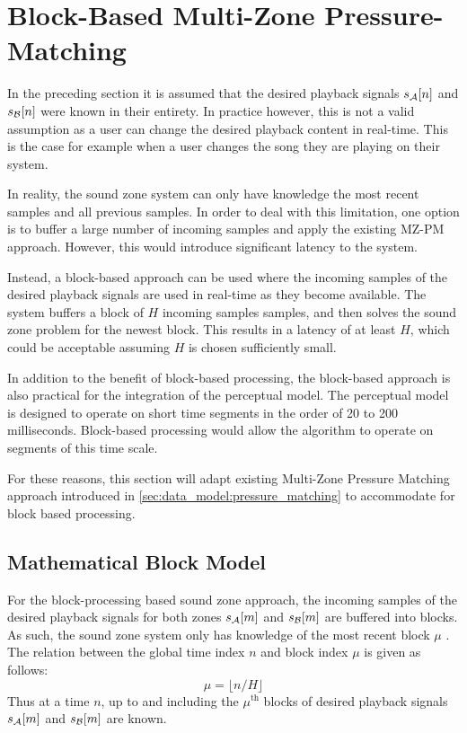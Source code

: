\section{Block-Based Multi-Zone Pressure-Matching}
In the preceding section it is assumed that the desired playback signals $s_{\mathcal{A}}[n]$ and $s_{\mathcal{B}}[n]$ were known in their entirety.
In practice however, this is not a valid assumption as a user can change the desired playback content in real-time.
This is the case for example when a user changes the song they are playing on their system.

In reality, the sound zone system can only have knowledge the most recent samples and all previous samples.
In order to deal with this limitation, one option is to buffer a large number of incoming samples and apply the existing MZ-PM approach.
However, this would introduce significant latency to the system.

Instead, a block-based approach can be used where the incoming samples of the desired playback signals are used in real-time as they become available.
The system buffers a block of $H$ incoming samples samples, and then solves the sound zone problem for the newest block.
This results in a latency of at least $H$, which could be acceptable assuming $H$ is chosen sufficiently small. 

In addition to the benefit of block-based processing, the block-based approach is also practical for the integration of the perceptual model.
The perceptual model is designed to operate on short time segments in the order of 20 to 200 milliseconds.
Block-based processing would allow the algorithm to operate on segments of this time scale.

For these reasons, this section will adapt existing Multi-Zone Pressure Matching approach introduced in \autoref{sec:data_model:pressure_matching} 
to accommodate for block based processing.

\subsection{Mathematical Block Model}
For the block-processing based sound zone approach, the incoming samples of the desired playback signals for both zones $s_{\mathcal{A}}[m]$ and $s_{\mathcal{B}}[m]$ are buffered into blocks.
As such, the sound zone system only has knowledge of the most recent block $\mu$ .
The relation between the global time index $n$ and block index $\mu$ is given as follows:  
\begin{equation}
      \mu = \lfloor n / H \rfloor
\end{equation}
Thus at a time $n$, up to and including the $\mu^\text{th}$ blocks of desired playback signals $s_{\mathcal{A}}[m]$ and $s_{\mathcal{B}}[m]$ are known.

